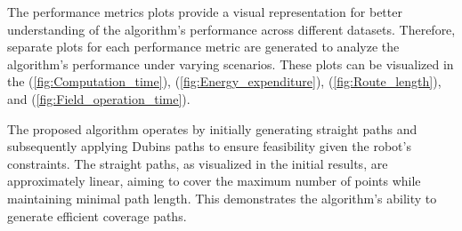 

The performance metrics plots provide a visual representation for better understanding of the algorithm's performance across different datasets. Therefore, separate plots for each performance metric are generated to analyze the algorithm's performance under varying scenarios. These plots can be visualized in the (\autoref{fig:Computation_time}), (\autoref{fig:Energy_expenditure}), (\autoref{fig:Route_length}), and (\autoref{fig:Field_operation_time}).







The proposed algorithm operates by initially generating straight paths and subsequently applying Dubins paths to ensure feasibility given the robot's constraints. The straight paths, as visualized in the initial results, are approximately linear, aiming to cover the maximum number of points while maintaining minimal path length. This demonstrates the algorithm's ability to generate efficient coverage paths.

